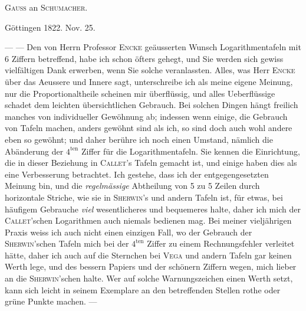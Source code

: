 \begin{center}
\textsc{Gauss} an \textsc{Schumacher}.
\end{center}
\begin{flushright}
Göttingen 1822. Nov. 25.
\end{flushright}
--- --- Den von Herrn Professor \textsc{Encke} geäusserten Wunsch Logarithmentafeln mit
6 Ziffern betreffend, habe ich schon öfters gehegt, und Sie werden sich gewiss
vielfältigen Dank erwerben, wenn Sie solche veranlassten. Alles, was Herr \textsc{Encke}
über das Aeussere und Innere sagt, unterschreibe ich als meine eigene Meinung,
nur die Proportionaltheile scheinen mir überflüssig, und alles Ueberflüssige schadet dem leichten übersichtlichen Gebrauch. Bei solchen Dingen hängt freilich
manches von individueller Gewöhnung ab; indessen wenn einige, die Gebrauch
von Tafeln machen, anders gewöhnt sind als ich, so sind doch auch wohl andere
eben so gewöhnt; und daher berühre ich noch einen Umstand, nämlich die Abänderung der \(4^{\mathrm{ten}}\) Ziffer für die Logarithmentafeln. Sie kennen die Einrichtung,
die in dieser Beziehung in \textsc{Callet}'s Tafeln gemacht ist, und einige haben dies als
eine Verbesserung betrachtet. Ich gestehe, dass ich der entgegengesetzten Meinung bin, und die \textit{regelmässige} Abtheilung von 5 zu 5 Zeilen durch horizontale
Striche, wie sie in \textsc{Sherwin}'s und andern Tafeln ist, für etwas, bei häufigem Gebrauche \textit{viel} wesentlicheres und bequemeres halte, daher ich mich der \textsc{Callet}'schen Logarithmen auch niemals bedienen mag. Bei meiner vieljährigen Praxis
weiss ich auch nicht einen einzigen Fall, wo der Gebrauch der \textsc{Sherwin}'schen Tafeln mich bei der \(4^{\mathrm{ten}}\) Ziffer zu einem Rechnungsfehler verleitet hätte, daher ich
auch auf die Sternchen bei \textsc{Vega} und andern Tafeln gar keinen Werth lege, und
des bessern Papiers und der schönern Ziffern wegen, mich lieber an die \textsc{Sherwin}'schen halte. Wer auf solche Warnungszeichen einen Werth setzt, kann sich
leicht in seinem Exemplare an den betreffenden Stellen rothe oder grüne Punkte
machen. ---
